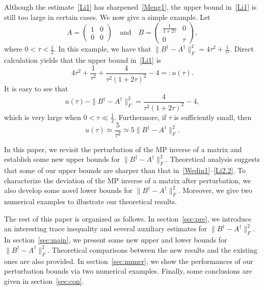 \documentclass[11pt]{article}
\begin{document}
Although the estimate~\eqref{Li1} has sharpened~\eqref{Meng1}, the upper bound in~\eqref{Li1} is still too large in certain cases. We now give a simple example. Let
\begin{equation}\label{Ex0}
A=\begin{pmatrix}
1 & 0 \\
0 & 0
\end{pmatrix} \quad \text{and} \quad B=\begin{pmatrix}
\frac{1}{1+2\tau} & 0 \\
0 & \tau
\end{pmatrix},
\end{equation}
where $0<\tau<\frac{1}{2}$. In this example, we have that $\|B^{\dagger}-A^{\dagger}\|_{F}^{2}=4\tau^{2}+\frac{1}{\tau^{2}}$. Direct calculation yields that the upper bound in~\eqref{Li1} is
\begin{displaymath}
4\tau^{2}+\frac{1}{\tau^{2}}+\frac{4}{\tau^{2}(1+2\tau)^{2}}-4=:u(\tau).
\end{displaymath}
It is easy to see that
\begin{displaymath}
u(\tau)-\|B^{\dagger}-A^{\dagger}\|_{F}^{2}=\frac{4}{\tau^{2}(1+2\tau)^{2}}-4,
\end{displaymath}
which is very large when $0<\tau\ll\frac{1}{2}$. Furthermore, if $\tau$ is sufficiently small, then
\begin{displaymath}
u(\tau)\simeq\frac{5}{\tau^{2}}\simeq 5\|B^{\dagger}-A^{\dagger}\|_{F}^{2}.
\end{displaymath}

In this paper, we revisit the perturbation of the MP inverse of a matrix and establish some new upper bounds for $\|B^{\dagger}-A^{\dagger}\|_{F}^{2}$. Theoretical analysis suggests that some of our upper bounds are sharper than that in~\eqref{Wedin1}--\eqref{Li2.2}. To characterize the deviation of the MP inverse of a matrix after perturbation, we also develop some novel lower bounds for $\|B^{\dagger}-A^{\dagger}\|_{F}^{2}$. Moreover, we give two numerical examples to illustrate our theoretical results.

The rest of this paper is organized as follows. In section~\ref{sec:pre}, we introduce an interesting trace inequality and several auxiliary estimates for $\|B^{\dagger}-A^{\dagger}\|_{F}^{2}$. In section~\ref{sec:main}, we present some new upper and lower bounds for $\|B^{\dagger}-A^{\dagger}\|_{F}^{2}$. Theoretical comparisons between the new results and the existing ones are also provided. In section~\ref{sec:numer}, we show the performances of our perturbation bounds via two numerical examples. Finally, some conclusions are given in section~\ref{sec:con}.
\end{document}
